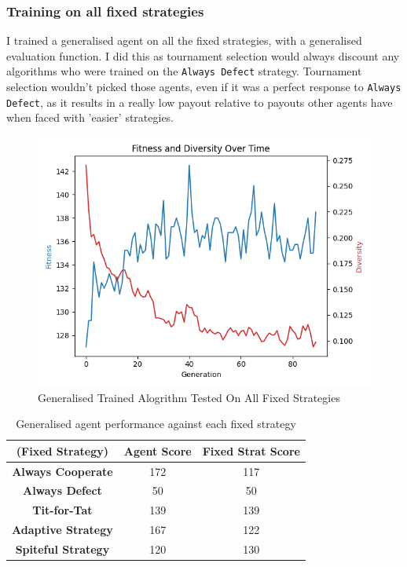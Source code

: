 \documentclass[11pt]{scrartcl} %
\begin{document}
\subsubsection{Training on all fixed strategies}
\label{Training on all fixed strategies}
I trained a generalised agent on all the fixed strategies, with a generalised evaluation function.
I did this as tournament selection would always discount any algorithms who were trained on the \texttt{Always Defect} strategy.
Tournament selection wouldn't picked those agents, even if it was a perfect response to \texttt{Always Defect}, as it results in a really low payout relative to payouts other agents have when faced with 'easier' strategies. 

\begin{figure}[H]
	\centering
	\includegraphics[width=0.8\linewidth]{Figures/part_1/generalised.png}
	\caption{Generalised Trained Alogrithm Tested On All Fixed Strategies}
	\label{fig:general_graph}
\end{figure}

\begin{table}[h!]
    \centering
    \begin{tabular}{|c|c|c|}
        \hline
		\textbf{(Fixed Strategy)} & \textbf{Agent Score} & \textbf{Fixed Strat Score} \\ \hline
        \textbf{Always Cooperate} & 172 & 117\\ \hline
        \textbf{Always Defect} & 50 & 50 \\ \hline
        \textbf{Tit-for-Tat} & 139 & 139 \\ \hline
        \textbf{Adaptive Strategy} & 167 & 122 \\ \hline
        \textbf{Spiteful Strategy} & 120 & 130 \\ \hline
    \end{tabular}
    \caption{Generalised agent performance against each fixed strategy}
    \label{tab:gen_agent_vs_fixed_strats}
\end{table}
\end{document}
